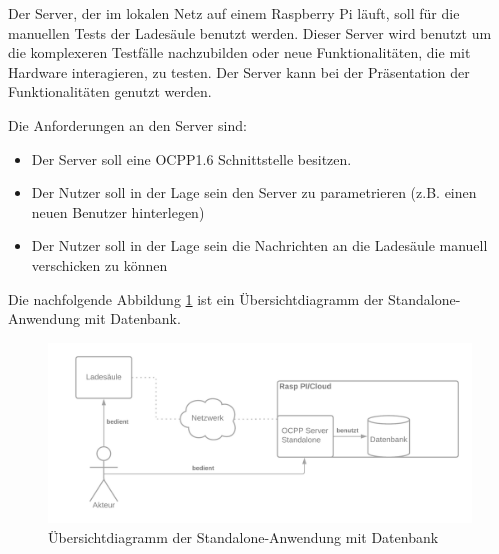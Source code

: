Der Server, der im lokalen Netz auf einem Raspberry Pi läuft, soll für die manuellen Tests der Ladesäule benutzt werden.
Dieser Server wird benutzt um die komplexeren Testfälle nachzubilden oder neue Funktionalitäten, die mit Hardware interagieren, zu testen.
Der Server kann bei der Präsentation der Funktionalitäten genutzt werden.

Die Anforderungen an den Server sind:
\begin{itemize}
    \item Der Server soll eine OCPP1.6 Schnittstelle besitzen.
    \item Der Nutzer soll in der Lage sein den Server zu parametrieren (z.B. einen neuen Benutzer hinterlegen)
    \item Der Nutzer soll in der Lage sein die Nachrichten an die Ladesäule manuell verschicken zu können
\end{itemize}

Die nachfolgende Abbildung \ref{fig:summaryDiagrammStandaloneWithDB} ist ein Übersichtdiagramm der Standalone-Anwendung mit Datenbank.
\begin{figure}[H]
    \centering
    \includegraphics[width=1\textwidth]{./images/OCPP Server Standalone mit DB.png}
    \caption[Übersichtdiagramm der Standalone-Anwendung mit Datenbank]{Übersichtdiagramm der Standalone-Anwendung mit Datenbank}
    \label{fig:summaryDiagrammStandaloneWithDB}
\end{figure}